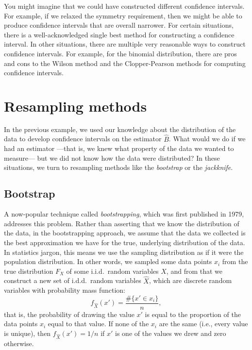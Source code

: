 You might imagine that we could have constructed different confidence intervals. For example,
if we relaxed the symmetry requirement, then we might be able to produce confidence intervals
that are overall narrower. For certain situations, there is a well-acknowledged single best
method for constructing a confidence interval. In other situations, there are multiple very
reasonable ways to construct confidence intervals. For example, for the binomial distribution,
there are pros and cons to the Wilson method and the Clopper-Pearson methods for computing
confidence intervals.

\section{Resampling methods}

In the previous example, we used our knowledge about the distribution of the
data to develop confidence intervals on the estimator $\hat{B}$. What would we
do if we had an estimator ---that is, we knew what property of the data we
wanted to measure--- but we did not know how the data were distributed?  In
these situations, we turn to resampling methods like the \emph{bootstrap} or
the \emph{jackknife}.

\subsection{Bootstrap}

A now-popular technique called \emph{bootstrapping}, which was first published in 1979, addresses this problem. Rather than asserting that we know the distribution of the data, in the bootstrapping approach, we assume that the data we collected is the best approximation we have for the true, underlying distribution of the data. In statistics jargon, this means we use the sampling distribution as if it were the population distribution. In other words, we sampled some data points $x_i$ from the true distribution $F_X$ of some i.i.d.~random variables $X$, and from that we construct a new set of i.d.d.~random variables $\hat{X}$, which are discrete random variables with probability mass function:
\begin{equation*}
    f_{\hat{X}}(x') = \frac{\#\{x' \in x_i\}}{n},
\end{equation*}
that is, the probability of drawing the value $x'$ is equal to the proportion of the data points $x_i$ equal to that value. If none of the $x_i$ are the same (i.e., every value is unique), then $f_{\hat{X}}(x') = 1/n$ if $x'$ is one of the values we drew and zero otherwise.

